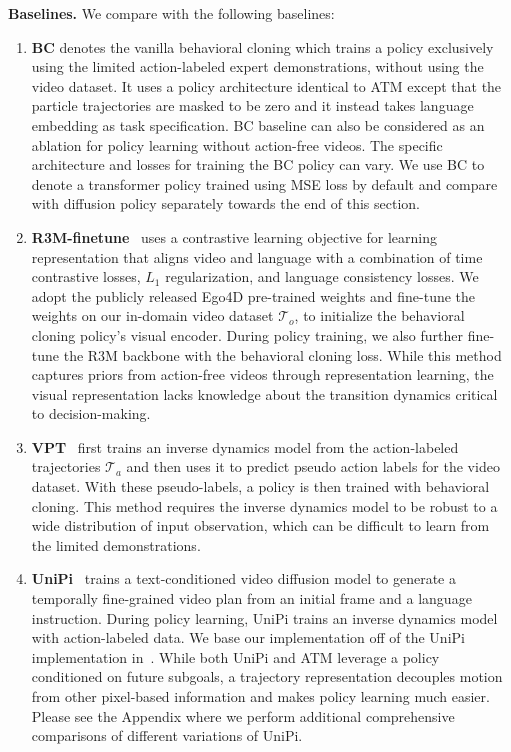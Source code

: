 \textbf{Baselines.}
We compare with the following baselines:
\begin{enumerate}
    \item \textbf{BC} denotes the vanilla behavioral cloning which trains a policy exclusively using the limited action-labeled expert demonstrations, without using the video dataset. It uses a policy architecture identical to ATM except that the particle trajectories are masked to be zero and it instead takes language embedding as task specification. BC baseline can also be considered as an ablation for policy learning without action-free videos. The specific architecture and losses for training the BC policy can vary. We use BC to denote a transformer policy trained using MSE loss by default and compare with diffusion policy separately towards the end of this section.
    \item  \textbf{R3M-finetune}~\cite{nair2023r3m} uses a contrastive learning objective for learning representation that aligns video and language with a combination of time contrastive losses, $L_{1}$ regularization, and language consistency losses. We adopt the publicly released Ego4D pre-trained weights and fine-tune the weights on our in-domain video dataset $\mathcal{T}_o$, to initialize the behavioral cloning policy's visual encoder. During policy training, we also further fine-tune the R3M backbone with the behavioral cloning loss. While this method captures priors from action-free videos through representation learning, the visual representation lacks knowledge about the transition dynamics critical to decision-making.
    \item \textbf{VPT}~\cite{baker2022vpt} first trains an inverse dynamics model from the action-labeled trajectories $\mathcal{T}_a$ and then uses it to predict pseudo action labels for the video dataset. With these pseudo-labels, a policy is then trained with behavioral cloning. This method requires the inverse dynamics model to be robust to a wide distribution of input observation, which can be difficult to learn from the limited demonstrations. 
    \item \textbf{UniPi}~\cite{du2023unipi, Ko2023Learning,black2023zero} trains a text-conditioned video diffusion model to generate a temporally fine-grained video plan from an initial frame and a language instruction. During policy learning, UniPi trains an inverse dynamics model with action-labeled data. We base our implementation off of the UniPi implementation in~\citet{Ko2023Learning}. While both UniPi and ATM leverage a policy conditioned on future subgoals, a trajectory representation decouples motion from other pixel-based information and makes policy learning much easier. Please see the Appendix where we perform additional comprehensive comparisons of different variations of UniPi. 
\end{enumerate}

